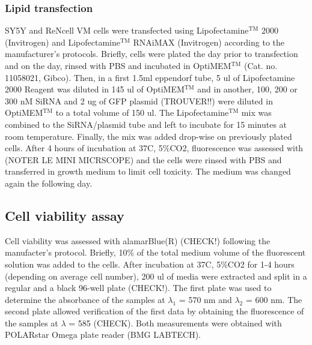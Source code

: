\documentclass[onecolumn,10pt]{asme2ej}
\begin{document}
\subsubsection{Lipid transfection}
SY5Y and ReNcell VM cells were transfected using Lipofectamine$^{\text{TM}}$ 2000 (Invitrogen) and Lipofectamine$^{\text{TM}}$ RNAiMAX (Invitrogen) according to the manufacturer's protocols. Briefly, cells were plated the day prior to transfection and on the day, rinsed with PBS and incubated in OptiMEM$^{\text{TM}}$ (Cat. no. 11058021, Gibco). Then, in a first 1.5ml  eppendorf tube, 5 ul of Lipofectamine 2000 Reagent was diluted in 145 ul of OptiMEM$^{\text{TM}}$ and in another, 100, 200 or 300 nM SiRNA and 2 ug of GFP plasmid (TROUVER!!) were diluted in OptiMEM$^{\text{TM}}$ to a total volume of 150 ul. The Lipofectamine$^{\text{TM}}$ mix was combined to the SiRNA/plasmid tube and left to incubate for 15 minutes at room temperature. Finally, the mix was added drop-wise on previously plated cells. After 4 hours of incubation at 37C, 5\%CO2, fluorescence was assessed with (NOTER LE MINI MICRSCOPE) and the cells were rinsed with PBS and transferred in growth medium to limit cell toxicity. The medium was changed again the following day.


\subsection{Cell viability assay}
Cell viability was assessed with alamarBlue(R) (CHECK!) following the manufacter's protocol. Briefly, 10\% of the total medium volume of the fluorescent solution was added to the cells. After incubation at 37C, 5\%CO2 for 1-4 hours (depending on average cell number), 200 ul of media were extracted and split in a regular and a black 96-well plate (CHECK!). The first plate was used to determine the absorbance of the samples at $\lambda_1$ = 570 nm and $\lambda_2$ = 600 nm. The second plate allowed verification of the first data by obtaining the fluorescence of the samples at $\lambda$ = 585 (CHECK). Both measurements were obtained with POLARstar Omega plate reader (BMG LABTECH).


\end{document}
